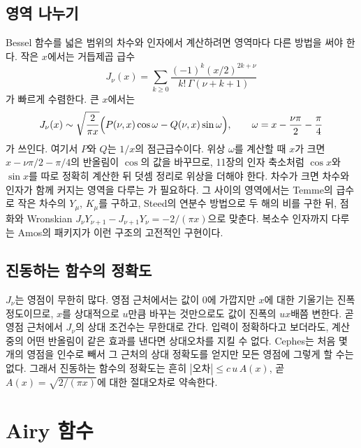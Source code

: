 \subsection{영역 나누기}

Bessel 함수를 넓은 범위의 차수와 인자에서 계산하려면 영역마다 다른 방법을 써야 한다. 작은 $x$에서는 거듭제곱 급수
\[
J_\nu(x)=\sum_{k\ge0}\frac{(-1)^k(x/2)^{2k+\nu}}{k!\,\Gamma(\nu+k+1)}
\]
가 빠르게 수렴한다. 큰 $x$에서는 
\[
J_\nu(x)\sim\sqrt{\frac2{\pi x}}\Bigl(P(\nu,x)\cos\omega-Q(\nu,x)\sin\omega\Bigr),\qquad\omega=x-\frac{\nu\pi}2-\frac\pi4
\]
가 쓰인다. 여기서 $P$와 $Q$는 $1/x$의 점근급수이다. 위상 $\omega$를 계산할 때 $x$가 크면 $x-\nu\pi/2-\pi/4$의 반올림이 $\cos$의 값을 바꾸므로, 11장의 인자 축소처럼 $\cos x$와 $\sin x$를 따로 정확히 계산한 뒤 덧셈 정리로 위상을 더해야 한다. 차수가 크면 차수와 인자가 함께 커지는 영역을 다루는 가 필요하다\cite{dlmf}. 그 사이의 영역에서는 Temme의 급수로 작은 차수의 $Y_\mu$, $K_\mu$를 구하고\cite{temme1975bessel}, Steed의 연분수 방법으로 두 해의 비를 구한 뒤\cite{barnett1974,thompson1986coulomb}, 점화와 Wronskian $J_\nu Y_{\nu+1}-J_{\nu+1}Y_\nu=-2/(\pi x)$으로 맞춘다. 복소수 인자까지 다루는 Amos의 패키지가 이런 구조의 고전적인 구현이다\cite{amos1986}.

\subsection{진동하는 함수의 정확도}

$J_\nu$는 영점이 무한히 많다. 영점 근처에서는 값이 $0$에 가깝지만 $x$에 대한 기울기는 진폭 정도이므로, $x$를 상대적으로 $u$만큼 바꾸는 것만으로도 값이 진폭의 $ux$배쯤 변한다. 곧 영점 근처에서 $J_\nu$의 상대 조건수는 무한대로 간다. 입력이 정확하다고 보더라도, 계산 중의 어떤 반올림이 같은 효과를 낸다면 상대오차를 지킬 수 없다. Cephes는 처음 몇 개의 영점을 인수로 빼서 그 근처의 상대 정확도를 얻지만 모든 영점에 그렇게 할 수는 없다. 그래서 진동하는 함수의 정확도는 흔히 $|\text{오차}|\le c\,u\,A(x)$, 곧  $A(x)=\sqrt{2/(\pi x)}$에 대한 절대오차로 약속한다.

\section{Airy 함수}
\label{sec:airy}

